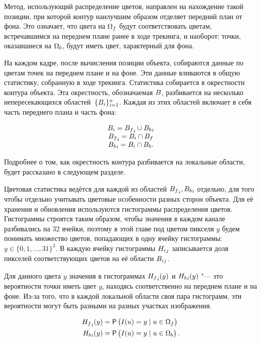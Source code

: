 Метод, использующий распределение цветов, направлен на нахождение такой
позиции, при которой контур наилучшим образом отделяет передний план от фона.
Это означает, что цвета на $\Omega_f$ будут соответствовать цветам,
встречавшимся на переднем плане ранее в ходе трекинга, и наоборот: точки,
оказавшиеся на $\Omega_b$, будут иметь цвет, характерный для фона.

На каждом кадре, после вычисления позиции объекта, собираются данные по цветам
точек на переднем плане и на фоне.
Эти данные вливаются в общую статистику, собранную в ходе трекинга. 
Статистика собирается в окрестности контура объекта.
Эта окрестность, обозначаемая $B$, разбивается на несколько
непересекающихся областей~$\{B_i\}_{i = 1}^n$.
Каждая из этих областей включает в себя часть переднего плана и часть фона:

\begin{equation}
\label{eqn:histo_partitioning}
\begin{array}{c}
B_i = {B_f}_i \cup {\ensuremath{B_b}}_i \\
{B_f}_i = B_i \cap B_f \\
{B_b}_i = B_i \cap B_b
\text{.}
\end{array}
\end{equation}

Подробнее о том, как окрестность контура разбивается на локальные области,
будет
рассказано в следующем разделе.

Цветовая статистика ведётся для каждой из областей ${B_f}_i,
{B_b}_i$ отдельно, для того чтобы отдельно учитывать цветовые
особенности разных сторон объекта.
Для её хранения и обновления используются гистограммы распределения цветов.
Гистограммы строятся таким образом, чтобы значения в каждом канале разбивались
на 32 ячейки, поэтому в этой главе под цветом пикселя $y$ будем понимать
множество цветов, попадающих в одну ячейку гистограммы:
$y \in \{0, 1, \dots, 31\}^3$.
В каждую ячейку гистограммы ${H_i}_j$ записывается доля пикселей
соответствующих
цветов на её области ${B_i}_j$.

Для данного цвета $y$ значения в гистограммах ${H_f}_i(y)$ и
${H_b}_i(y)$ "--- это вероятности точки иметь цвет $y$, находясь
соответственно на переднем плане и на фоне.
Из-за того, что в каждой локальной области своя пара гистограмм, эти
вероятности могут быть разными на разных участках изображения.

\begin{align}
\label{eqn:H_f_Y}
    {\ensuremath{H_f}}_i(y) &= \mathsf{P} \left( I(\mathnormal{u}) = y \mid \mathnormal{u} \in \Omega_f \right) \\
    {H_b}_i(y) &= \mathsf{P} \left( I(\mathnormal{u}) = y \mid \mathnormal{u} \in \Omega_b \right)
\text{.}
\end{align}


